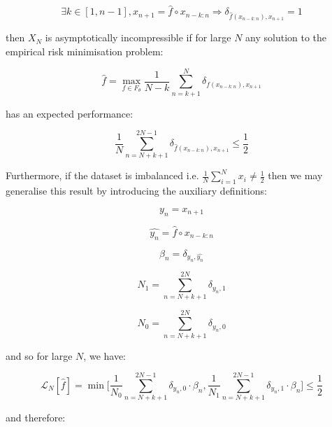 \documentclass{article}
\begin{document}
\begin{equation}
\exists k \in [1,n-1], x_{n+1} = \hat{f} \circ x_{n-k:n} \Rightarrow \delta_{\hat{f}(x_{n-k:n}),x_{n+1}} = 1	
\end{equation}

then $X_N$ is asymptotically incompressible if for large $N$ any solution to the 
empirical risk minimisation problem: 

\begin{equation}
\hat{f} = \max_{f \in F_{\theta}} \frac{1}{N-k} \sum_{n=k+1}^N \delta_{f(x_{n-k:n}),x_{n+1}}
\end{equation}

has an expected performance: 

\begin{equation}
\frac{1}{N} \sum_{n=N+k+1}^{2N-1} \delta_{\hat{f}(x_{n-k:n}),x_{n+1}}
 \leq \frac{1}{2}
\end{equation}

Furthermore, if the dataset is imbalanced i.e. $\frac{1}{N} \sum_{i=1}^N x_i \neq \frac{1}{2}$ then we may generalise this result by introducing the auxiliary definitions: 

\begin{equation}
y_n = x_{n+1}	
\end{equation}

\begin{equation}
\hat{y_n} = \hat{f} \circ x_{n-k:n}
\end{equation}

\begin{equation}
\beta_n = \delta_{y_n,\hat{y_n}}	
\end{equation}

\begin{equation}
N_1 = \sum_{n=N+k+1}^{2N} \delta_{y_n,1}	
\end{equation}

\begin{equation}
N_0 = \sum_{n=N+k+1}^{2N} \delta_{y_n,0}	
\end{equation}

and so for large $N$, we have: 

\begin{equation}
\mathcal{L}_N[\hat{f}] = \min \Big[\frac{1}{N_0} \sum_{n=N+k+1}^{2N-1} \delta_{y_n,0} \cdot \beta_n,  \frac{1}{N_1} \sum_{n=N+k+1}^{2N-1} \delta_{y_n,1} \cdot \beta_n \Big] \leq \frac{1}{2}
\end{equation}

and therefore:
\end{document}
